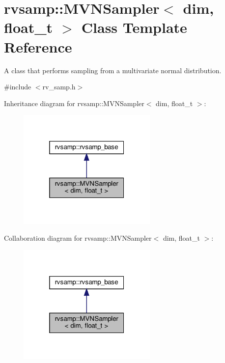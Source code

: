 \hypertarget{classrvsamp_1_1MVNSampler}{}\section{rvsamp\+:\+:M\+V\+N\+Sampler$<$ dim, float\+\_\+t $>$ Class Template Reference}
\label{classrvsamp_1_1MVNSampler}


A class that performs sampling from a multivariate normal distribution.  




{\ttfamily \#include $<$rv\+\_\+samp.\+h$>$}



Inheritance diagram for rvsamp\+:\+:M\+V\+N\+Sampler$<$ dim, float\+\_\+t $>$\+:
\nopagebreak
\begin{figure}[H]
\begin{center}
\leavevmode
\includegraphics[width=193pt]{classrvsamp_1_1MVNSampler__inherit__graph}
\end{center}
\end{figure}


Collaboration diagram for rvsamp\+:\+:M\+V\+N\+Sampler$<$ dim, float\+\_\+t $>$\+:
\nopagebreak
\begin{figure}[H]
\begin{center}
\leavevmode
\includegraphics[width=193pt]{classrvsamp_1_1MVNSampler__coll__graph}
\end{center}
\end{figure}

